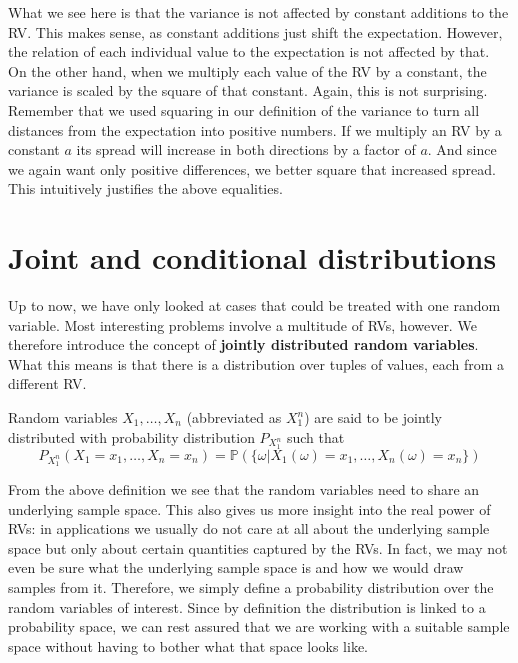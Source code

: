 \documentclass[a4paper,11pt,leqno]{report}
\begin{document}
What we see here is that the variance is not affected by constant additions to the RV. This makes sense, as constant additions just shift
the expectation. However, the relation of each individual value to the expectation is not affected by that. On the other hand,
when we multiply each value of the RV by a constant, the variance is scaled by the square of that constant. Again, this is not surprising.
Remember that we used squaring in our definition of the variance to turn all distances from the expectation into positive numbers.
If we multiply an RV by a constant $ a $ its spread will increase in both directions by a factor of $ a $. 
And since we again want only positive differences,
we better square that increased spread. This intuitively justifies the above equalities.



\section{Joint and conditional distributions}

Up to now, we have only looked at cases that could be treated with one random variable. Most interesting problems involve a multitude
of RVs, however. We therefore introduce the concept of \textbf{jointly distributed random variables}. What this means is that
there is a distribution over tuples of values, each from a different RV.

\begin{Definition}
Random variables $ X_{1}, \ldots, X_{n} $ (abbreviated as $ X^{n}_{1} $) 
are said to be jointly distributed with probability distribution $ P_{X_{1}^{n}} $ such that
$$ P_{X^{n}_{1}}(X_{1}=x_{1}, \ldots, X_{n}=x_{n}) = \mathbb{P}(\{\omega|X_{1}(\omega) = x_{1}, \ldots, X_{n}(\omega)=x_{n}\}) $$
\end{Definition}

From the above definition we see that the random variables need to share an underlying sample space. This also gives us more
insight into the real power of RVs: in applications we usually do not care at all about the underlying sample space but only about
certain quantities captured by the RVs. In fact, we may not even be sure what the underlying sample space is and how we would
draw samples from it. Therefore, we simply define a probability distribution over the random variables of interest. Since by definition
the distribution is linked to a probability space, we can rest assured that we are working with a suitable sample space without
having to bother what that space looks like.
\end{document}
